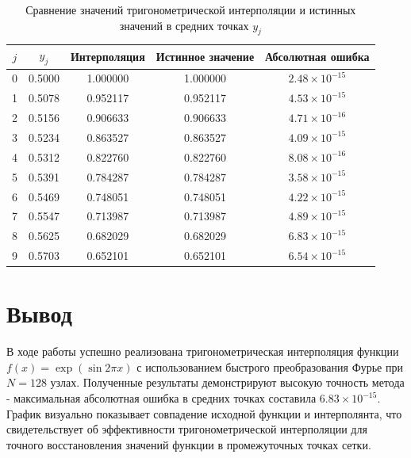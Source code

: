 \documentclass[a4paper, 14pt]{extarticle}
\begin{document}
\begin{table}[H]
    \centering
    \caption{Сравнение значений тригонометрической интерполяции и истинных значений в средних точках \( y_j \)}
    \begin{tabular}{ccccc}
    \toprule
    \( j \) & \( y_j \) & Интерполяция & Истинное значение & Абсолютная ошибка \\
    \midrule
    0 & 0.5000 & 1.000000 & 1.000000 & \( 2.48 \times 10^{-15} \) \\
    1 & 0.5078 & 0.952117 & 0.952117 & \( 4.53 \times 10^{-15} \) \\
    2 & 0.5156 & 0.906633 & 0.906633 & \( 4.71 \times 10^{-16} \) \\
    3 & 0.5234 & 0.863527 & 0.863527 & \( 4.09 \times 10^{-15} \) \\
    4 & 0.5312 & 0.822760 & 0.822760 & \( 8.08 \times 10^{-16} \) \\
    5 & 0.5391 & 0.784287 & 0.784287 & \( 3.58 \times 10^{-15} \) \\
    6 & 0.5469 & 0.748051 & 0.748051 & \( 4.22 \times 10^{-15} \) \\
    7 & 0.5547 & 0.713987 & 0.713987 & \( 4.89 \times 10^{-15} \) \\
    8 & 0.5625 & 0.682029 & 0.682029 & \( 6.83 \times 10^{-15} \) \\
    9 & 0.5703 & 0.652101 & 0.652101 & \( 6.54 \times 10^{-15} \) \\
    \bottomrule
    \end{tabular}
\end{table}



\section{Вывод}


В ходе работы успешно реализована тригонометрическая интерполяция функции \( f(x) = \exp(\sin 2\pi x) \) с использованием 
быстрого преобразования Фурье при \( N = 128 \) узлах.
Полученные результаты демонстрируют высокую точность метода - максимальная абсолютная ошибка в средних 
точках составила \( 6.83 \times 10^{-15} \). График визуально показывает совпадение исходной функции и 
интерполянта, что свидетельствует об эффективности тригонометрической интерполяции для точного восстановления значений функции в 
промежуточных точках сетки.
\end{document}
